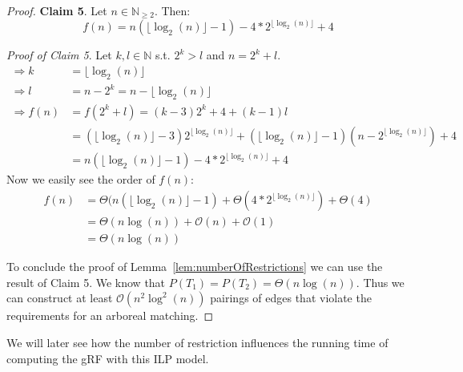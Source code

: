\begin{proof}
\textbf{Claim 5}. Let $n \in \mathbb{N}_{\geq 2}$. Then:
$$f(n) = n(\lfloor \log_2(n) \rfloor -1) -4*2^{\lfloor \log_2(n) \rfloor} +4$$

\textit{Proof of Claim 5}. Let $k,l \in \mathbb{N}$ s.t. $2^k > l$ and $n = 2^k +l$.
\begin{align*}
\Rightarrow k &= \lfloor \log_2(n) \rfloor \\
\Rightarrow l &= n - 2^k = n - \lfloor \log_2(n) \rfloor \\
\Rightarrow f(n) &= f(2^k+l) = (k-3)2^k +4 + (k-1)l \\
&= (\lfloor \log_2(n) \rfloor -3)2^{\lfloor \log_2(n) \rfloor} + (\lfloor \log_2(n) \rfloor -1) (n-2^{\lfloor \log_2(n) \rfloor}) +4 \\
&= n(\lfloor \log_2(n) \rfloor -1) -4*2^{\lfloor \log_2(n) \rfloor} +4
\end{align*}
Now we easily see the order of $f(n)$:
\begin{align*}
f(n) &=\Theta(n(\lfloor \log_2(n) \rfloor -1) +\Theta(4*2^{\lfloor \log_2(n) \rfloor}) +\Theta(4) \\
&=\Theta(n\log(n)) +\mathcal{O}(n) +\mathcal{O}(1)\\
&=\Theta(n\log(n))
\end{align*}

To conclude the proof of Lemma~\ref{lem:numberOfRestrictions} we can use the result of Claim 5. We know that $P(T_1) = P(T_2) =\Theta(n\log(n))$. Thus we can construct at least $\mathcal{O}(n^2\log^2(n))$ pairings of edges that violate the requirements for an arboreal matching.
\end{proof}
We will later see how the number of restriction influences the running time of computing the gRF with this ILP model.